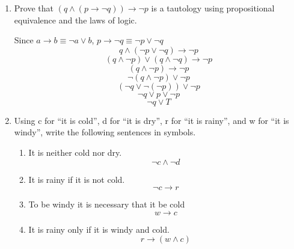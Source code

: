 \documentclass[12pt]{article}
\begin{document}
\begin{enumerate}[leftmargin=\labelsep]
\item Prove that $\left(q \wedge \left(p \to \lnot q\right)\right) \to \lnot p$ is a tautology using propositional equivalence and the laws of logic.

    Since $ a \to b \equiv \lnot a \vee b $,  $p \to \lnot q \equiv \lnot p \vee \lnot q $
    \begin{equation*}
        q \wedge \left(\lnot p \vee \lnot q\right) \to \lnot p
    \end{equation*}
    \begin{equation*}
        \left(q \wedge \lnot p\right) \vee \left(q \wedge \lnot q\right) \to \lnot p 
    \end{equation*}
    \begin{equation*}
        \left(q \wedge \lnot p\right) \to \lnot p 
    \end{equation*}
    \begin{equation*}
        \lnot \left(q \wedge \lnot p\right) \vee \lnot p
    \end{equation*}
    \begin{equation*}
        \left(\lnot q \vee \lnot \left(\lnot p \right) \right) \vee \lnot p
    \end{equation*}
    \begin{equation*}
         \lnot q \vee p \vee \lnot p
    \end{equation*}
    \begin{equation*}
        \lnot q \vee T
    \end{equation*}
    
\item Using c for “it is cold”, d for “it is dry”, r for “it is rainy”, and w for “it is windy”, write the following sentences in symbols.
    \begin{enumerate}
        \item It is neither cold nor dry.
            \begin{equation*}
                \lnot c \wedge \lnot d
            \end{equation*}
        \item It is rainy if it is not cold.
            \begin{equation*}
                \lnot c \to r
            \end{equation*}
        \item To be windy it is necessary that it be cold
            \begin{equation*}
                w \to c
            \end{equation*}
        \item It is rainy only if it is windy and cold.
            \begin{equation*}
                r \to \left(w \wedge c\right)
            \end{equation*}
    \end{enumerate}


\end{enumerate}
\end{document}

